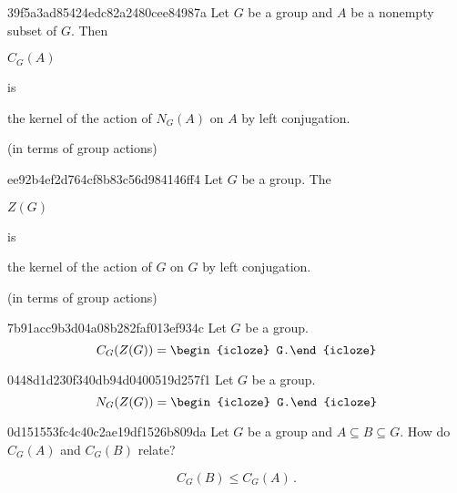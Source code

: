 \begin{note}{39f5a3ad85424edc82a2480cee84987a}
    Let \({ G }\) be a group and \({ A }\) be a nonempty subset of \({ G }\).
    Then \begin{icloze}{2}\({ C_G(A) }\)\end{icloze} is \begin{icloze}{1}the kernel of the action of \({ N_G(A) }\) on \({ A }\) by left conjugation.\end{icloze}

    \begin{center}
        \tiny
        (in terms of group actions)
    \end{center}
\end{note}

\begin{note}{ee92b4ef2d764cf8b83c56d984146ff4}
    Let \({ G }\) be a group.
    The \begin{icloze}{2}\({ Z(G) }\)\end{icloze} is \begin{icloze}{1}the kernel of the action of \({ G }\) on \({ G }\) by left conjugation.\end{icloze}

    \begin{center}
        \tiny
        (in terms of group actions)
    \end{center}
\end{note}

\begin{note}{7b91acc9b3d04a08b282faf013ef934c}
    Let \({ G }\) be a group.
    \[
        C_G (Z(G)) = \begin{icloze}{1}G.\end{icloze}
    \]
\end{note}

\begin{note}{0448d1d230f340db94d0400519d257f1}
    Let \({ G }\) be a group.
    \[
        N_G (Z(G)) = \begin{icloze}{1}G.\end{icloze}
    \]
\end{note}

\begin{note}{0d151553fc4c40c2ae19df1526b809da}
    Let \({ G }\) be a group and \({ A \subseteq B \subseteq G }\).
    How do \({ C_G(A) }\) and \({ C_G(B) }\) relate?

    \begin{cloze}{1}
        \[
            C_G(B) \leq C_G(A)\,.
        \]
    \end{cloze}
\end{note}


